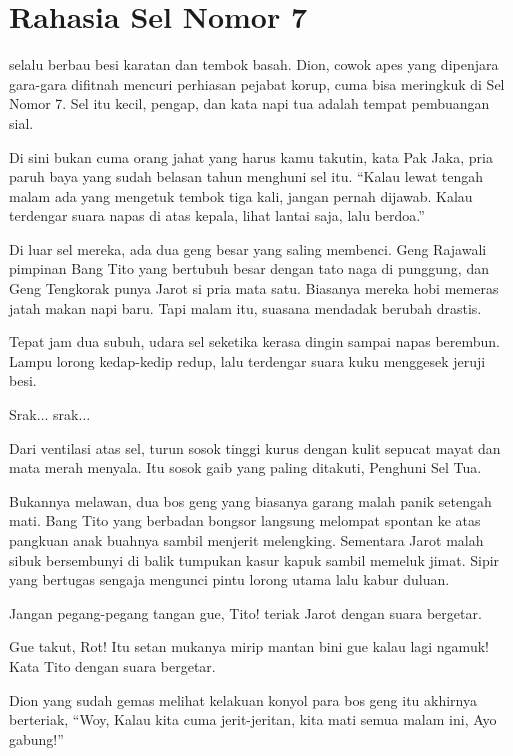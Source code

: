 \chapter*{Rahasia Sel Nomor 7}

 selalu berbau besi karatan dan tembok basah. Dion, cowok apes yang dipenjara gara-gara difitnah mencuri perhiasan pejabat korup, cuma bisa meringkuk di Sel Nomor 7. Sel itu kecil, pengap, dan kata napi tua adalah tempat pembuangan sial.


Di sini bukan cuma orang jahat yang harus kamu takutin, kata Pak Jaka, pria paruh baya yang sudah belasan tahun menghuni sel itu. ``Kalau lewat tengah malam ada yang mengetuk tembok tiga kali, jangan pernah dijawab. Kalau terdengar suara napas di atas kepala, lihat lantai saja, lalu berdoa.''


Di luar sel mereka, ada dua geng besar yang saling membenci. Geng Rajawali pimpinan Bang Tito yang bertubuh besar dengan tato naga di punggung, dan Geng Tengkorak punya Jarot si pria mata satu. Biasanya mereka hobi memeras jatah makan napi baru. Tapi malam itu, suasana mendadak berubah drastis.


Tepat jam dua subuh, udara sel seketika kerasa dingin sampai napas berembun. Lampu lorong kedap-kedip redup, lalu terdengar suara kuku menggesek jeruji besi.


Srak$\dots$ srak$\dots$


Dari ventilasi atas sel, turun sosok tinggi kurus dengan kulit sepucat mayat dan mata merah menyala. Itu sosok gaib yang paling ditakuti, Penghuni Sel Tua.


Bukannya melawan, dua bos geng yang biasanya garang malah panik setengah mati. Bang Tito yang berbadan bongsor langsung melompat spontan ke atas pangkuan anak buahnya sambil menjerit melengking. Sementara Jarot malah sibuk bersembunyi di balik tumpukan kasur kapuk sambil memeluk jimat. Sipir yang bertugas sengaja mengunci pintu lorong utama lalu kabur duluan.


Jangan pegang-pegang tangan gue, Tito! teriak Jarot dengan suara bergetar.


Gue takut, Rot! Itu setan mukanya mirip mantan bini gue kalau lagi ngamuk! Kata Tito dengan suara bergetar.


Dion yang sudah gemas melihat kelakuan konyol para bos geng itu akhirnya berteriak, ``Woy, Kalau kita cuma jerit-jeritan, kita mati semua malam ini, Ayo gabung!''


